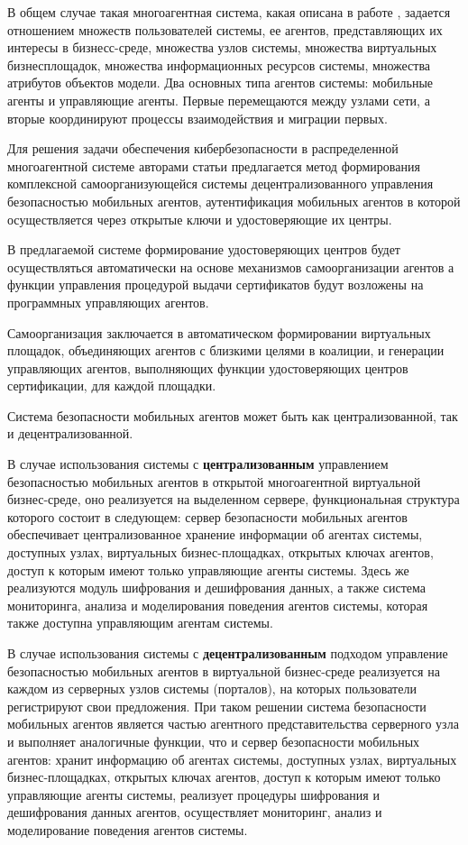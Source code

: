 В общем случае такая многоагентная система, какая описана в работе \cite{mob}, задается отношением множеств
пользователей системы, ее агентов, представляющих их интересы в бизнесс-среде, множества узлов системы,
множества виртуальных бизнесплощадок, множества информационных ресурсов системы, множества атрибутов объектов модели.
Два основных типа агентов системы: мобильные агенты и управляющие агенты. Первые перемещаются между узлами сети,
а вторые координируют процессы взаимодействия и миграции первых.

Для решения задачи обеспечения кибербезопасности в распределенной многоагентной системе авторами статьи \cite{mob}
предлагается метод формирования комплексной самоорганизующейся системы децентрализованного управления безопасностью
мобильных агентов, аутентификация мобильных агентов в которой осуществляется через открытые ключи и
удостоверяющие их центры.

В предлагаемой системе формирование удостоверяющих центров будет осуществляться автоматически на основе механизмов
самоорганизации агентов а функции управления процедурой выдачи сертификатов будут возложены на программных
управляющих агентов.

Самоорганизация заключается в автоматическом формировании виртуальных площадок, объединяющих
агентов с близкими целями в коалиции, и генерации управляющих агентов, выполняющих функции удостоверяющих центров
сертификации, для каждой площадки.

Система безопасности мобильных агентов может быть как централизованной, так и децентрализованной.

В случае использования системы с \textbf{централизованным} управлением безопасностью мобильных агентов в
открытой многоагентной виртуальной бизнес-среде, оно реализуется на выделенном сервере, функциональная
структура которого состоит в следующем: сервер безопасности мобильных агентов обеспечивает
централизованное хранение информации об агентах системы, доступных узлах, виртуальных бизнес-площадках,
открытых ключах агентов, доступ к которым имеют только управляющие агенты системы. Здесь же реализуются
модуль шифрования и дешифрования данных, а также система мониторинга, анализа и моделирования поведения
агентов системы, которая также доступна управляющим агентам системы.

В случае использования системы с \textbf{децентрализованным} подходом управление безопасностью мобильных агентов
в виртуальной бизнес-среде реализуется на каждом из серверных узлов системы
(порталов), на которых пользователи регистрируют свои предложения. При таком решении система безопасности
мобильных агентов является
частью агентного представительства серверного узла и выполняет аналогичные функции, что и сервер безопасности
мобильных агентов: хранит информацию об агентах системы, доступных узлах, виртуальных бизнес-площадках,
открытых ключах агентов, доступ к которым имеют только управляющие агенты системы, реализует процедуры
шифрования и дешифрования данных агентов, осуществляет мониторинг, анализ и моделирование поведения агентов
системы.

